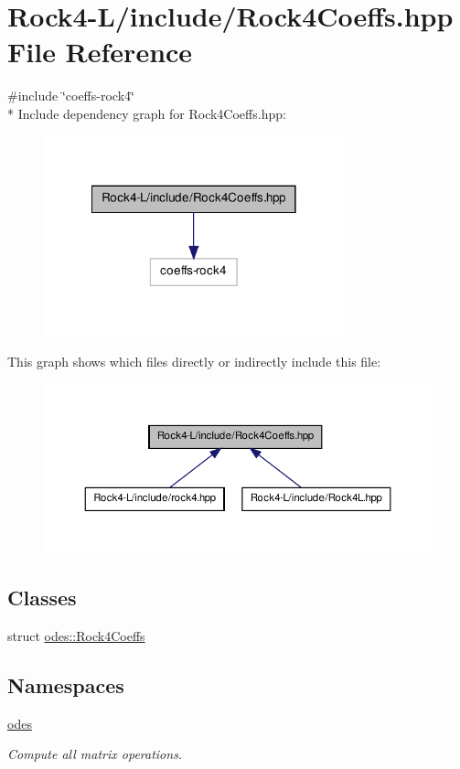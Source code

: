 \hypertarget{Rock4-L_2include_2Rock4Coeffs_8hpp}{\section{Rock4-\/\-L/include/\-Rock4\-Coeffs.hpp File Reference}
\label{Rock4-L_2include_2Rock4Coeffs_8hpp}
}
{\ttfamily \#include \char`\"{}coeffs-\/rock4\char`\"{}}\\*
Include dependency graph for Rock4\-Coeffs.\-hpp\-:
\nopagebreak
\begin{figure}[H]
\begin{center}
\leavevmode
\includegraphics[width=246pt]{Rock4-L_2include_2Rock4Coeffs_8hpp__incl}
\end{center}
\end{figure}
This graph shows which files directly or indirectly include this file\-:
\nopagebreak
\begin{figure}[H]
\begin{center}
\leavevmode
\includegraphics[width=350pt]{Rock4-L_2include_2Rock4Coeffs_8hpp__dep__incl}
\end{center}
\end{figure}
\subsection*{Classes}
\begin{DoxyCompactItemize}
\item 
struct \hyperlink{structodes_1_1Rock4Coeffs}{odes\-::\-Rock4\-Coeffs}
\end{DoxyCompactItemize}
\subsection*{Namespaces}
\begin{DoxyCompactItemize}
\item 
\hyperlink{namespaceodes}{odes}
\begin{DoxyCompactList}\small\item\em Compute all matrix operations. \end{DoxyCompactList}\end{DoxyCompactItemize}
